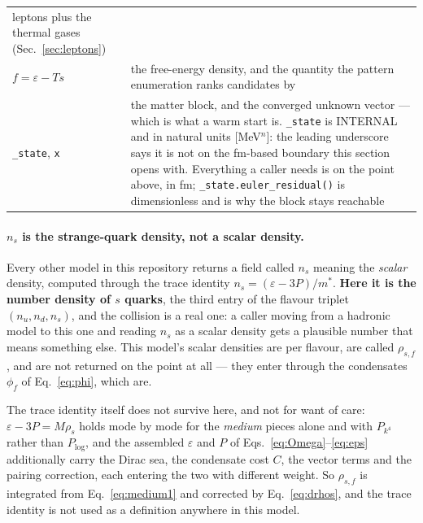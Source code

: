 \documentclass[aps,prc,onecolumn,superscriptaddress,nofootinbib,10pt]{revtex4-2}
\begin{document}
\begin{center}
\begin{tabular}{@{}l p{}@{}}
    leptons plus the thermal gases (Sec.~\ref{sec:leptons}) \\
$f = \varepsilon - T s$
  & the free-energy density, and the quantity the pattern enumeration ranks
    candidates by \\
\midrule
\texttt{\_state}, \texttt{x}
  & the matter block, and the converged unknown vector --- which is what a
    warm start is. \texttt{\_state} is INTERNAL and in natural units
    [MeV$^n$]: the leading underscore says it is not on the fm-based boundary
    this section opens with. Everything a caller needs is on the point above,
    in fm; \texttt{\_state.euler\_residual()} is dimensionless and is why the
    block stays reachable \\
\bottomrule
\end{tabular}
\end{center}

\paragraph{$n_s$ is the strange-quark density, not a scalar density.} Every
other model in this repository returns a field called $n_s$ meaning the
\emph{scalar} density, computed through the trace identity
$n_s = (\varepsilon - 3P)/m^{*}$. \textbf{Here it is the number density of $s$
quarks}, the third entry of the flavour triplet $(n_u, n_d, n_s)$, and the
collision is a real one: a caller moving from a hadronic model to this one and
reading $n_s$ as a scalar density gets a plausible number that means something
else. This model's scalar densities are per flavour, are called $\rho_{s,f}$,
and are not returned on the point at all --- they enter through the condensates
$\phi_f$ of Eq.~\eqref{eq:phi}, which are.

The trace identity itself does not survive here, and not for want of care:
$\varepsilon - 3P = M \rho_s$ holds mode by mode for the \emph{medium} pieces
alone and with $P_{k^4}$ rather than $P_{\log}$, and the assembled
$\varepsilon$ and $P$ of Eqs.~\eqref{eq:Omega}--\eqref{eq:eps} additionally
carry the Dirac sea, the condensate cost $C$, the vector terms and the pairing
correction, each entering the two with different weight. So $\rho_{s,f}$ is
integrated from Eq.~\eqref{eq:medium1} and corrected by
Eq.~\eqref{eq:drhos}, and the trace identity is not used as a definition
anywhere in this model.
\end{document}
